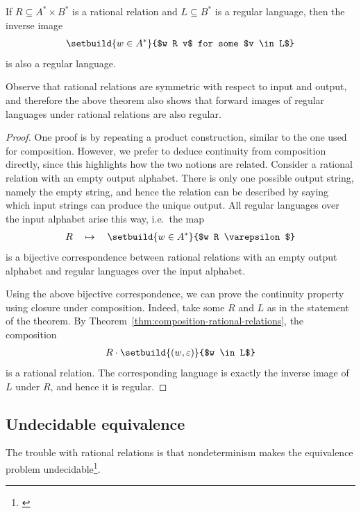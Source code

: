 \begin{theorem}\label{thm:continuity-rational-relations}
    If $R \subseteq A^* \times B^*$ is a rational relation and $L \subseteq B^*$ is a regular language, then the inverse image 
    \begin{align*}
    \setbuild{ w \in A^*}{$w R v$ for some $v \in L$}
    \end{align*}
    is also a regular language. 
\end{theorem}
Observe that rational relations are symmetric with respect to input and output, and therefore the above theorem also shows that forward images of regular languages under rational relations are also regular.
\begin{proof}
    One proof is by repeating a product construction, similar to the one used for composition. However, we prefer to deduce continuity from composition directly, since this highlights how the two notions are related. Consider a rational relation
    with an empty output alphabet. There is only one possible output string, namely the empty string, and hence the relation can be described by saying which input strings can produce the unique output. All regular languages over the input alphabet arise this way, i.e.~the map
    \begin{align*}
    R \quad \mapsto \quad \setbuild{ w \in A^*}{$w R \varepsilon$}
    \end{align*}
    is a bijective correspondence between rational relations with an empty output alphabet and regular languages over the input alphabet.

    Using the above  bijective correspondence, we can prove the continuity property using closure under composition. Indeed, take some $R$ and $L$ as in the statement of the theorem. By Theorem~\ref{thm:composition-rational-relations}, the composition 
    \begin{align*}
    R \cdot \setbuild{(w,\varepsilon)}{$w \in L$}
    \end{align*}
    is a rational relation. The corresponding language is exactly the inverse image of $L$ under $R$, and hence it is regular.
\end{proof}



\subsection{Undecidable equivalence} The trouble with rational relations is that  nondeterminism makes the equivalence problem undecidable\footnote{\cite[p.410]{Griffiths1968}}.


